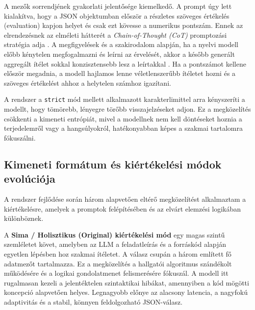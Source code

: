 \documentclass[12pt,a4paper]{article}
\begin{document}
A mezők sorrendjének gyakorlati jelentősége kiemelkedő. A prompt úgy lett kialakítva, hogy a JSON objektumban először a részletes szöveges értékelés (evaluation) kapjon helyet és csak ezt kövesse a numerikus pontszám. Ennek az elrendezésnek az elméleti hátterét a \textit{Chain-of-Thought (CoT)} promptozási stratégia adja \cite{wei2022chain, kojima2022zero}. A megfigyelések és a szakirodalom alapján, ha a nyelvi modell előbb kénytelen megfogalmazni és leírni az érvelését, akkor a később generált aggregált ítélet sokkal konzisztensebb lesz a leírtakkal \cite{nye2021show, wei2022chain, kojima2022zero}. Ha a pontszámot kellene először megadnia, a modell hajlamos lenne véletlenszerűbb ítéletet hozni és a szöveges értékelést ahhoz a helytelen számhoz igazítani.

A rendszer a \texttt{strict} mód mellett alkalmazott karakterlimittel arra kényszeríti a modellt, hogy tömörebb, lényegre törőbb visszajelzéseket adjon. Ez a megközelítés csökkenti a kimeneti entrópiát, mivel a modellnek nem kell döntéseket hoznia a terjedelemről vagy a hangsúlyokról, hatékonyabban képes a szakmai tartalomra fókuszálni.

\subsection{Kimeneti formátum és kiértékelési módok evolúciója}
\label{sec:formatum_evolucio}
A rendszer fejlődése során három alapvetően eltérő megközelítést alkalmaztam a kiértékelésre, amelyek a promptok felépítésében és az elvárt elemzési logikában különböznek.

A \textbf{Sima / Holisztikus (Original) kiértékelési mód} egy magas szintű szemléletet követ, amelyben az LLM a feladatleírás és a forráskód alapján egyetlen lépésben hoz szakmai ítéletet. A válasz csupán a három említett fő adatmezőt tartalmazza. Ez a megközelítés a hallgatói algoritmus szándékolt működésére és a logikai gondolatmenet felismerésére fókuszál. A modell itt rugalmasan kezeli a jelentéktelen szintaktikai hibákat, amennyiben a kód mögötti koncepció alapvetően helyes. Legnagyobb előnye az alacsony latencia, a nagyfokú adaptivitás és a stabil, könnyen feldolgozható JSON-válasz.
\end{document}
